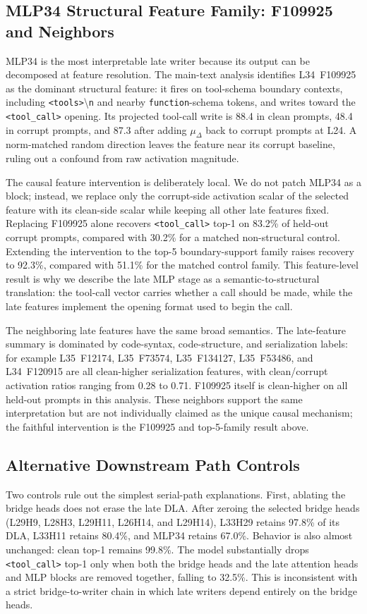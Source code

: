 \subsection{MLP34 Structural Feature Family: F109925 and Neighbors}
MLP34 is the most interpretable late writer because its output can be decomposed
at feature resolution.  The main-text analysis identifies L34~F109925 as the
dominant structural feature: it fires on tool-schema boundary contexts,
including \texttt{<tools>}\textbackslash\texttt{n} and nearby
\texttt{function}-schema tokens, and writes toward the
\texttt{<tool\_call>} opening.  Its projected tool-call write is 88.4 in clean
prompts, 48.4 in corrupt prompts, and 87.3 after adding $\mu_\Delta$ back to
corrupt prompts at L24.  A norm-matched random direction leaves the feature
near its corrupt baseline, ruling out a confound from raw activation magnitude.

The causal feature intervention is deliberately local.  We do not patch MLP34
as a block; instead, we replace only the corrupt-side activation scalar of the
selected feature with its clean-side scalar while keeping all other late
features fixed.  Replacing F109925 alone recovers \texttt{<tool\_call>} top-1
on 83.2\% of held-out corrupt prompts, compared with 30.2\% for a matched
non-structural control.  Extending the intervention to the top-5
boundary-support family raises recovery to 92.3\%, compared with 51.1\% for
the matched control family.  This feature-level result is why we describe the
late MLP stage as a semantic-to-structural translation: the tool-call vector
carries whether a call should be made, while the late features implement the
opening format used to begin the call.

The neighboring late features have the same broad semantics.  The late-feature
summary is dominated by code-syntax, code-structure, and serialization labels:
for example L35~F12174, L35~F73574, L35~F134127, L35~F53486, and
L34~F120915 are all clean-higher serialization features, with clean/corrupt
activation ratios ranging from 0.28 to 0.71.  F109925 itself is clean-higher
on all held-out prompts in this analysis.  These neighbors support the same
interpretation but are not individually claimed as the unique causal mechanism;
the faithful intervention is the F109925 and top-5-family result above.

\subsection{Alternative Downstream Path Controls}
Two controls rule out the simplest serial-path explanations. First, ablating
the bridge heads does not erase the late DLA. After zeroing the selected bridge
heads (L29H9, L28H3, L29H11, L26H14, and L29H14), L33H29 retains 97.8\% of
its DLA, L33H11 retains 80.4\%, and MLP34 retains 67.0\%. Behavior is also
almost unchanged: clean top-1 remains 99.8\%. The model substantially drops
\texttt{<tool\_call>} top-1 only when both the bridge heads and the late
attention heads and MLP blocks are removed together, falling to 32.5\%. This is
inconsistent with a strict bridge-to-writer chain in which late writers depend
entirely on the bridge heads.

